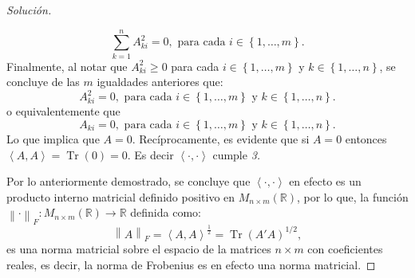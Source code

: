 \documentclass[10.5pt,notitlepage]{article}
\newenvironment{solucion}
  {\begin{proof}[Solución]}
  {\end{proof}}
\DeclareMathOperator{\Tr}{Tr}
\newcommand{\RR}{\mathbb{R}}
\newcommand{\norm}[1]{\left\| #1 \right\|}
\newcommand{\inner}[1]{\left\langle #1 \right\rangle}
\newcommand{\kis}[1]{\left\{ #1 \right\}}
\theoremstyle{plain}
\begin{document}
\begin{solucion}
\begin{itemize}
    \[
    \sum_{k = 1}^{n}A_{ki}^2 = 0, \text{ para cada } i \in \kis{1, \hdots, m}.  
    \] 
    Finalmente, al notar que \(A_{ki}^2 \geq 0\) para cada \(i \in \kis{1, \hdots, m}\) y \(k \in \kis{1, \hdots, n}\), se concluye de las \(m\) igualdades anteriores que: 
    \[
    A_{ki}^2 = 0, \text{ para cada \(i \in \kis{1, \hdots, m}\) y \(k \in \kis{1, \hdots, n}\)}.
    \]
    o equivalentemente que 
    \[
    A_{ki} = 0, \text{ para cada \(i \in \kis{1, \hdots, m}\) y \(k \in \kis{1, \hdots, n}\)}.
    \]
    Lo que implica que \(A = 0\). Recíprocamente, es evidente que si \(A= 0\) entonces \(\inner{A,A} = \Tr(0)= 0\). Es decir \(\inner{\cdot, \cdot}\) cumple \textit{3.}
 \end{itemize}
 Por lo anteriormente demostrado, se concluye que \(\inner{\cdot,\cdot}\) en efecto es un producto interno matricial definido positivo en \(M_{n\times m}(\RR)\), por lo que, la función \(\norm{\cdot}_{F}:M_{n\times m}(\RR) \to \RR\) definida como: 
 \[
 \norm{A}_{F} = \inner{A,A}^{\frac{1}{2}} = \Tr(A'A)^{1/2},
 \]
es una norma matricial sobre el espacio de la matrices \(n\times m\) con coeficientes reales, es decir, la norma de Frobenius es en efecto una norma matricial.
\end{solucion}
\end{document}

